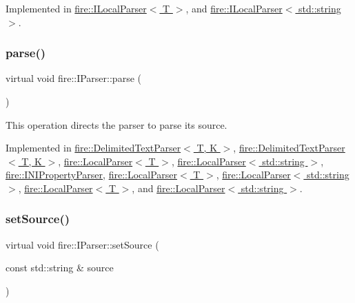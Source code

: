 Implemented in \hyperlink{a01740_ad46898c516adcce38acbb4800dc9777b}{fire\+::\+I\+Local\+Parser$<$ T $>$}, and \hyperlink{a01740_ad46898c516adcce38acbb4800dc9777b}{fire\+::\+I\+Local\+Parser$<$ std\+::string $>$}.

\mbox{\label{a01748_af36ac6eedd8c27d2f418869193d7d03c}} 
\subsubsection{\texorpdfstring{parse()}{parse()}}
{\footnotesize\ttfamily virtual void fire\+::\+I\+Parser\+::parse (\begin{DoxyParamCaption}{ }\end{DoxyParamCaption})\hspace{0.3cm}{\ttfamily [pure virtual]}}

This operation directs the parser to parse its source. 

Implemented in \hyperlink{a01736_a773fa7ed28cb9d8c384ad94bd81fc93f}{fire\+::\+Delimited\+Text\+Parser$<$ T, K $>$}, \hyperlink{a01736_a686df5548771cae833d5e721442a821a}{fire\+::\+Delimited\+Text\+Parser$<$ T, K $>$}, \hyperlink{a01756_abd8929aea06c2dda40256d2e58236650}{fire\+::\+Local\+Parser$<$ T $>$}, \hyperlink{a01756_abd8929aea06c2dda40256d2e58236650}{fire\+::\+Local\+Parser$<$ std\+::string $>$}, \hyperlink{a01744_a31b6bad01e65ed4bb5f1ba297616c641}{fire\+::\+I\+N\+I\+Property\+Parser}, \hyperlink{a01756_ae904e264fe16708b3e434adea59e1b88}{fire\+::\+Local\+Parser$<$ T $>$}, \hyperlink{a01756_ae904e264fe16708b3e434adea59e1b88}{fire\+::\+Local\+Parser$<$ std\+::string $>$}, \hyperlink{a01756_a34fd9ffb0196c612c75b5288ed5e219b}{fire\+::\+Local\+Parser$<$ T $>$}, and \hyperlink{a01756_a34fd9ffb0196c612c75b5288ed5e219b}{fire\+::\+Local\+Parser$<$ std\+::string $>$}.

\mbox{\label{a01748_a0dbeff2b9bd8dbfb2aad7a424eef87d1}} 
\subsubsection{\texorpdfstring{set\+Source()}{setSource()}\hspace{0.1cm}{\footnotesize\ttfamily [1/2]}}
{\footnotesize\ttfamily virtual void fire\+::\+I\+Parser\+::set\+Source (\begin{DoxyParamCaption}\item[{const std\+::string \&}]{source }\end{DoxyParamCaption})\hspace{0.3cm}{\ttfamily [pure virtual]}}

